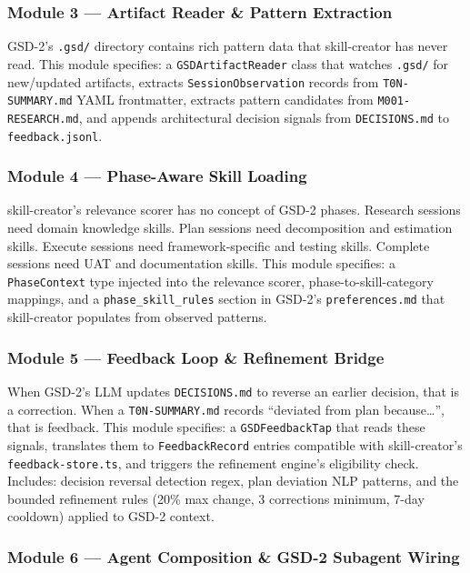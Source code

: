 \documentclass[11pt,letterpaper]{article}
\begin{document}
\subsubsection{Module 3 --- Artifact Reader \& Pattern Extraction}

GSD-2's \texttt{.gsd/} directory contains rich pattern data that skill-creator has never read. This module specifies: a \texttt{GSDArtifactReader} class that watches \texttt{.gsd/} for new/updated artifacts, extracts \texttt{SessionObservation} records from \texttt{T0N-SUMMARY.md} YAML frontmatter, extracts pattern candidates from \texttt{M001-RESEARCH.md}, and appends architectural decision signals from \texttt{DECISIONS.md} to \texttt{feedback.jsonl}.

\subsubsection{Module 4 --- Phase-Aware Skill Loading}

skill-creator's relevance scorer has no concept of GSD-2 phases. Research sessions need domain knowledge skills. Plan sessions need decomposition and estimation skills. Execute sessions need framework-specific and testing skills. Complete sessions need UAT and documentation skills. This module specifies: a \texttt{PhaseContext} type injected into the relevance scorer, phase-to-skill-category mappings, and a \texttt{phase\_skill\_rules} section in GSD-2's \texttt{preferences.md} that skill-creator populates from observed patterns.

\subsubsection{Module 5 --- Feedback Loop \& Refinement Bridge}

When GSD-2's LLM updates \texttt{DECISIONS.md} to reverse an earlier decision, that is a correction. When a \texttt{T0N-SUMMARY.md} records ``deviated from plan because\ldots'', that is feedback. This module specifies: a \texttt{GSDFeedbackTap} that reads these signals, translates them to \texttt{FeedbackRecord} entries compatible with skill-creator's \texttt{feedback-store.ts}, and triggers the refinement engine's eligibility check. Includes: decision reversal detection regex, plan deviation NLP patterns, and the bounded refinement rules (20\% max change, 3 corrections minimum, 7-day cooldown) applied to GSD-2 context.

\subsubsection{Module 6 --- Agent Composition \& GSD-2 Subagent Wiring}
\end{document}
